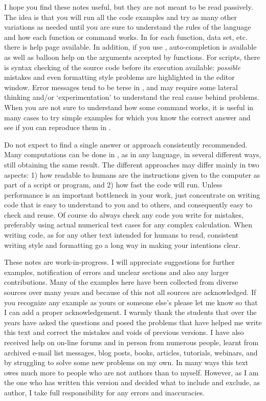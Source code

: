 \documentclass[paper=a4,10pt,div=17,headsepline,BCOR=12mm,twoside,open=right]{scrbook}\usepackage{knitr}
\begin{document}
I hope you find these notes useful, but they are not meant to be read passively. The idea is that you will run all the code examples and try as many other variations as needed until you are sure to understand the rules of the \R language and how each function or command works. In \R for each function, data set, etc. there is help page available. In addition, if you use \RStudio, auto-completion is available as well as balloon help on the arguments accepted by functions. For scripts, there is syntax checking of the source code before its execution available: \emph{possible} mistakes and even formatting style problems are highlighted in the editor window. Error messages tend to be terse in \R, and may require some lateral thinking and/or `experimentation' to understand the real cause behind problems. When you are not sure to understand how some command works, it is useful in many cases to try simple examples for which you know the correct answer and see if you can reproduce them in \R.

Do not expect to find a single answer or approach consistently recommended. Many computations can be done in \R, as in any language, in several different ways, still obtaining the same result. The different approaches may differ mainly in two aspects: 1) how readable to humans are the instructions given to the computer as part of a script or program, and 2) how fast the code will run. Unless performance is an important bottleneck in your work, just concentrate on writing code that is easy to understand to you and to others, and consequently easy to check and reuse. Of course do always check any code you write for mistakes, preferably using actual numerical test cases for any complex calculation. When writing code, as for any other text intended for humans to read, consistent writing style and formatting go a long way in making your intentions clear.

These notes are work-in-progress. I will appreciate suggestions for further examples, notification of errors and unclear sections and also any larger contributions. Many of the examples here have been collected from diverse sources over many years and because of this not all sources are acknowledged. If you recognize any example as yours or someone else's please let me know so that I can add a proper acknowledgement. I warmly thank the students that over the years have asked the questions and posed the problems that have helped me write this text and correct the mistakes and voids of previous versions. I have also received help on on-line forums and in person from numerous people, learnt from archived e-mail list messages, blog posts, books, articles, tutorials, webinars, and by struggling to solve some new problems on my own. In many ways this text owes much more to people who are not authors than to myself. However, as I am the one who has written this version and decided what to include and exclude, as author, I take full responsibility for any errors and inaccuracies.
\end{document}
